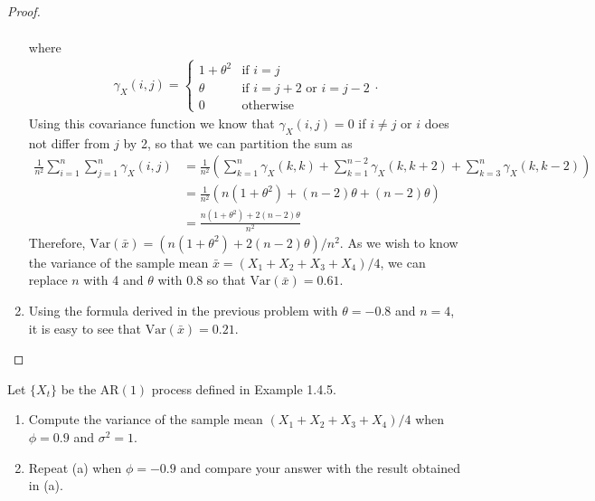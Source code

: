 \documentclass[12pt]{article}
\theoremstyle{definition}
\newenvironment{custompbm}[1]
  {\renewcommand\theproblem{#1}\problem}
  {\endproblem}
\newcommand{\V}{\text{Var}}
\newcommand{\gx}[2]{\gamma_X({#1}, {#2})}
\begin{document}
\begin{proof}
\begin{enumerate}
\begin{align*}
      \end{align*}
      where
      \begin{align*}
        \gamma_X(i,j) =
        \begin{cases}
          1 + \theta^2 & \text{if $i=j$} \\
          \theta & \text{if $i = j +2$ or $i = j -2$} \\
          0 & \text{otherwise}
        \end{cases}.
      \end{align*}
      Using this covariance function we know that $\gamma_X(i,j) = 0$ if $i \neq j$ or $i$ does not differ from $j$ by 2, so that we can partition the sum as
      \begin{align*}
        \frac{1}{n^2}\sum_{i=1}^n\sum_{j=1}^n \gx{i}{j}
        &= \frac{1}{n^2}\left(\sum_{k=1}^n\gx{k}{k} + \sum_{k=1}^{n-2}\gx{k}{k + 2} + \sum_{k=3}^{n}\gx{k}{k - 2}\right) \\
        &= \frac{1}{n^2}\left(n(1+\theta^2) + (n-2)\theta + (n-2)\theta\right) \\
        &= \frac{n(1 + \theta^2) + 2(n-2)\theta}{n^2}
      \end{align*}
      Therefore, $\V(\bar{x}) = (n(1 + \theta^2) + 2(n-2)\theta) / n^2$. As we wish to know the
      variance of the sample mean $\bar{x} = (X_1 + X_2 + X_3 + X_4) / 4$, we can replace $n$ with 4
      and $\theta$ with $0.8$ so that $\V(\bar{x}) = 0.61$.
    \item Using the formula derived in the previous problem with $\theta = -0.8$
      and $n=4$, it is easy to see that $\V(\bar{x}) = 0.21$.
  \end{enumerate}
\end{proof}


\begin{custompbm}{1.6}
  Let $\{ X_t \}$ be the $\text{AR}(1)$ process defined in Example 1.4.5.
  \begin{enumerate}
    \item Compute the variance of the sample mean $(X_1 + X_2 + X_3 + X_4) / 4$
      when $\phi = 0.9$ and $\sigma^2 = 1$.
    \item Repeat (a) when $\phi = -0.9$ and compare your answer with the result
      obtained in (a).
  \end{enumerate}
\end{custompbm}
\end{document}
